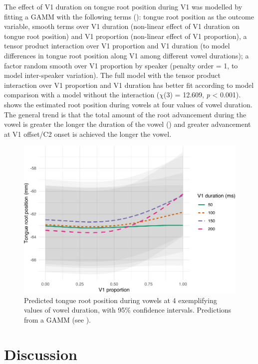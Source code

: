 \documentclass[preprint]{JASAnew}
\begin{document}
\label{s:trp-v1-dur}

The effect of V1 duration on tongue root position during V1 was modelled
by fitting a GAMM with the following terms
(): tongue root position as the outcome
variable, smooth terms over V1 duration (non-linear effect of V1
duration on tongue root position) and V1 proportion (non-linear effect
of V1 proportion), a tensor product interaction over V1 proportion and
V1 duration (to model differences in tongue root position along V1 among
different vowel durations); a factor random smooth over V1 proportion by
speaker (penalty order = 1, to model inter-speaker variation). The full
model with the tensor product interaction over V1 proportion and V1
duration has better fit according to model comparison with a model
without the interaction (\(\chi\)(3) = 12.609, \emph{p} \textless{}
0.001).  shows the estimated root position during vowels
at four values of vowel duration. The general trend is that the total
amount of the root advancement during the vowel is greater the longer
the duration of the vowel () and greater advancement at
V1 offset/C2 onset is achieved the longer the vowel.

\begin{figure}
\includegraphics[width=\linewidth]{./Figure6-1} \caption{Predicted tongue root position during vowels at 4 exemplifying values of vowel duration, with 95\% confidence intervals. Predictions from a GAMM (see ).}\label{f:Figure6}
\end{figure}

\hypertarget{discussion}{%
\section{Discussion}\label{discussion}}
\end{document}
